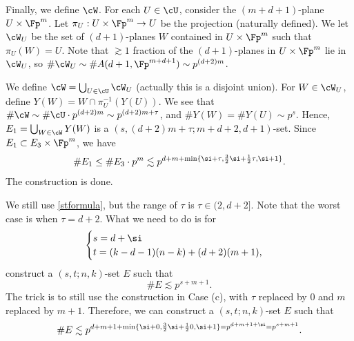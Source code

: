 Finally, we define $\cW$. For each $U\in \cU$, consider the $(m+d+1)$-plane $U\times \Fp^m$.
Let $\pi_U:U\times \Fp^m\rightarrow U$ be the projection (naturally defined). We let $\cW_U$ be the set of $(d+1)$-planes $W$ contained in $U\times \Fp^m$ such that $\pi_U(W)=U$. Note that $\gtrsim 1$ fraction of the $(d+1)$-planes in  $U\times \Fp^m$ lie in $\cW_U$, so $\#\cW_U\sim \#A(d+1,\Fp^{m+d+1})\sim p^{(d+2)m}$.

We define $\cW=\bigcup_{U\in \cU}\cW_U$ (actually this is a disjoint union). For $W\in \cW_U$, define $Y(W)=W\cap \pi_U^{-1}(Y(U))$. We see that $\#\cW\sim \#\cU\cdot p^{(d+2)m}\sim p^{(d+2)m+\tau}$, and $\#Y(W)=\#Y(U)\sim p^s$. Hence, $E_1=\bigcup_{W\in\cW}Y(W)$ is a $(s,(d+2)m+\tau;m+d+2,d+1)$-set. Since $E_1\subset E_3\times \Fp^m$, we have
\[ \#E_1\le \#E_3\cdot p^m\lesssim p^{d+m+\min\{\si+\tau,\frac32\si+\frac12\tau,\si+1\}}. \]
The construction is done.

\bigskip
{}

We still use \eqref{stformula}, but the range of $\tau$ is $\tau\in(2,d+2]$. Note that the worst case is when $\tau=d+2$.
What we need to do is for
\begin{equation}
    \begin{cases}
        s=d+\si\\
        t=(k-d-1)(n-k)+(d+2)(m+1),
    \end{cases}
\end{equation} 
construct a $(s,t;n,k)$-set $E$ such that
\[ \#E\lesssim p^{s+m+1}. \]
The trick is to still use the construction in Case (c), with $\tau$ replaced by $0$ and $m$ replaced by $m+1$. Therefore, we can construct a $(s,t;n,k)$-set $E$ such that
\[\#E\lesssim p^{d+m+1+\min\{\si+0,\frac32\si+\frac120,\si+1\}=p^{d+m+1+\si}=p^{s+m+1}}. \]
\
